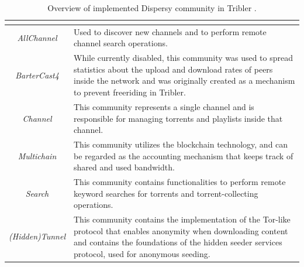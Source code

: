 \begin{table}[tbp]
	\centering
	\caption{Overview of implemented Dispersy community in Tribler \cite{2016:tribler-techdebt:vos}.}
	\label{tbl:community}
	\begin{tabular}{|c|p{11cm}|}
		\hline
		\rowcolor[HTML]{EFEFEF} 
		\multicolumn{1}{|c|}{\cellcolor[HTML]{EFEFEF}{\color[HTML]{333333} \textbf{Community Name}}} & \multicolumn{1}{c|}{\cellcolor[HTML]{EFEFEF}{\color[HTML]{333333} \textbf{Purpose}}}                                                                                                                                     \\ \hline
		\textit{AllChannel}                                                                          & Used to discover new channels and to perform remote channel search operations.                                                                                                                                           \\ \hline
		\textit{BarterCast4}\cite{2009:bartercast:meulpolder}                                                                         & While currently disabled, this community was used to spread statistics about the upload and download rates of peers inside the network and was originally created as a mechanism to prevent freeriding in Tribler. \\ \hline
		\textit{Channel}                                                                             & This community represents a single channel and is responsible for managing torrents and playlists inside that channel.                                                                                                   \\ \hline
		\textit{Multichain}          \cite{2015:multichain:norberhuis}                                                                & This community utilizes the blockchain technology, and can be regarded as the accounting mechanism that keeps track of shared and used bandwidth.                                                                         \\ \hline
		\textit{Search}                                                                              & This community contains functionalities to perform remote keyword searches for torrents and torrent-collecting operations.                                                                                               \\ \hline
		\textit{(Hidden)Tunnel}                                                                      & This community contains the implementation of the Tor-like protocol that enables anonymity when downloading content and contains the foundations of the hidden seeder services protocol, used for anonymous seeding.     \\ \hline
	\end{tabular}
\end{table}

